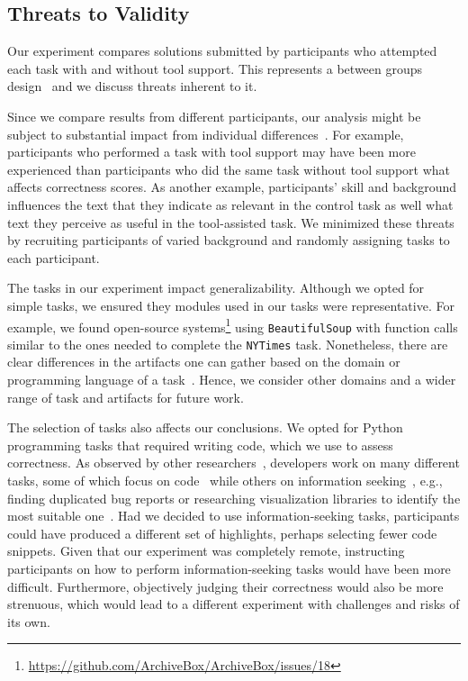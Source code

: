 
\subsection{Threats to Validity}
\label{cp6:threats}




Our experiment compares solutions submitted by participants who attempted each task with and without tool support. 
This represents a between groups design~\cite{Lazar2017-cp3} and we discuss threats inherent to it. 



Since we compare results from different participants, our analysis might be subject to substantial 
impact from individual differences~\cite{Lazar2017-cp3}. 
For example, participants who performed a task with tool support may have been more experienced than participants 
who did the same task without tool support what affects correctness scores.
As another example,  participants' skill and background 
influences the text that they indicate as relevant in the control task as well 
what text they perceive as useful in the tool-assisted task. 
We minimized these threats by recruiting participants of varied background and randomly
assigning tasks to each participant.



The tasks in our experiment impact generalizability. 
Although we opted for simple tasks, we ensured they 
modules used in our tasks were representative. 
For example, we found open-source systems\footnote{\url{https://github.com/ArchiveBox/ArchiveBox/issues/18}} using \texttt{BeautifulSoup} 
with function calls similar to the ones needed to complete the \texttt{NYTimes} task.
Nonetheless, there are clear differences in the artifacts one can gather 
based on the domain or programming language of a task~\cite{baltes2020}.
Hence, we consider other domains and a wider range of task 
and artifacts for future work. 



The selection of tasks also affects our conclusions. We opted for Python programming tasks that 
required writing code, which we use to assess correctness. 
As observed by other researchers~\cite{satterfield2020, meyer2020}, developers
work on many different tasks, some of which focus on code~\cite{Meyer2017}
while others on information seeking~\cite{gonccalves2011}, e.g., finding duplicated bug reports or researching visualization libraries to identify the most suitable one~\cite{satterfield2020}.
Had we decided to use information-seeking tasks, participants could have produced a different set of highlights,
perhaps selecting fewer code snippets. 
Given that 
our experiment was completely remote, instructing participants on how to perform information-seeking 
tasks would have been more difficult. Furthermore, objectively judging their correctness 
would also be more strenuous, which would lead to a different experiment with challenges and risks of its own.




